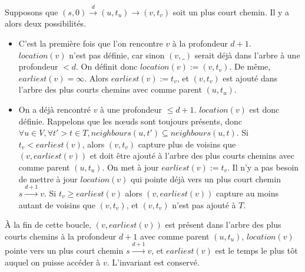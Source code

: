 \documentclass[12pt,a4paper]{article}
\begin{document}
Supposons que \((s, 0) \xrightarrow{d} (u, t_u) \rightarrow (v, t_v)\)
soit un plus court chemin. Il y a alors deux possibilités.
\begin{itemize}
\item C'est la première fois que l'on rencontre \(v\) à la profondeur
  \(d + 1\). \(location(v)\) n'est pas définie, car sinon \((v, \_)\)
  serait déjà dans l'arbre à une profondeur \(< d\). On définit donc
  \(location(v) := (v, t_v)\). De même, \(earliest(v) =
  \infty\). Alors \(earliest(v) := t_v\), et \((v, t_v)\) est ajouté
  dans l'arbre des plus courts chemins avec comme parent \((u, t_u)\).
\item On a déjà rencontré \(v\) à une profondeur \(\leq d +
  1\). \(location(v)\) est donc définie. Rappelons que les nœuds sont
  toujours présents, donc
  \(\forall u \in V, \forall t' > t \in T, neighbours(u, t') \subseteq
  neighbours(u, t)\). Si \(t_v < earliest(v)\), alors \((v, t_v)\)
  capture plus de voisins que \((v, earliest(v))\) et doit être ajouté
  à l'arbre des plus courts chemins avec comme parent \((u, t_u)\). On
  met à jour \(earliest(v) := t_v\). Il n'y a pas besoin de mettre à
  jour \(location(v)\) qui pointe déjà vers un plus court chemin
  \(s \xrightarrow{d+1} v\). Si \(t_v \geq earliest(v)\) alors
  \((v, earliest(v))\) capture au moins autant de voisins que
  \((v, t_v)\), et \((v, t_v)\) n'est pas ajouté à \(T\).
\end{itemize}
À la fin de cette boucle, \((v, earliest(v))\) est présent dans
l'arbre des plus courts chemins à la profondeur \(d + 1\) avec comme
parent \((u, t_u)\), \(location(v)\) pointe vers un plus court chemin
\(s \xrightarrow{d+1} v\), et \(earliest(v)\) est le temps le plus tôt
auquel on puisse accéder à \(v\). L'invariant est conservé.\\
\end{document}
